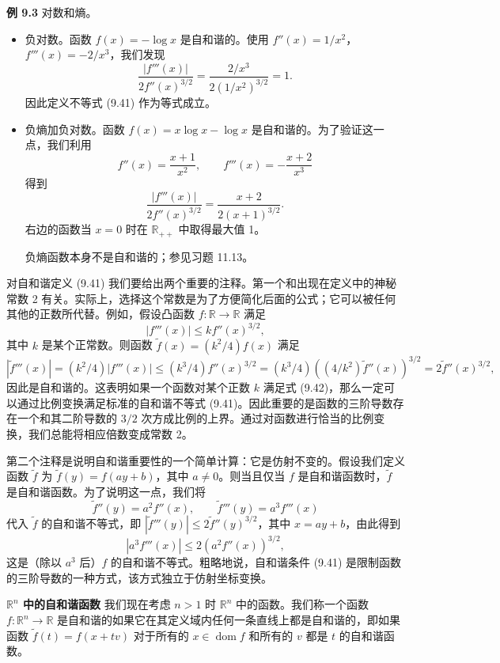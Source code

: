\documentclass[UTF8,12pt,a4paper,fontset=fandol]{ctexart}
\begin{document}
\noindent\textbf{例 9.3}\quad
对数和熵。
\begin{itemize}
\item 负对数。函数 $f(x)=-\log x$ 是自和谐的。使用 $f''(x)=1/x^2$，$f'''(x)=-2/x^3$，我们发现
\[
\frac{|f'''(x)|}{2f''(x)^{3/2}}=\frac{2/x^3}{2(1/x^2)^{3/2}}=1.
\]
因此定义不等式 (9.41) 作为等式成立。
\item 负熵加负对数。函数 $f(x)=x\log x-\log x$ 是自和谐的。为了验证这一点，我们利用
\[
f''(x)=\frac{x+1}{x^2},\qquad f'''(x)=-\frac{x+2}{x^3}
\]
得到
\[
\frac{|f'''(x)|}{2f''(x)^{3/2}}=\frac{x+2}{2(x+1)^{3/2}}.
\]
右边的函数当 $x=0$ 时在 $\mathbb{R}_{++}$ 中取得最大值 1。

负熵函数本身不是自和谐的；参见习题 11.13。
\end{itemize}

对自和谐定义 (9.41) 我们要给出两个重要的注释。第一个和出现在定义中的神秘常数 2 有关。实际上，选择这个常数是为了方便简化后面的公式；它可以被任何其他的正数所代替。例如，假设凸函数 $f:\mathbb{R}\to\mathbb{R}$ 满足
\begin{equation}
|f'''(x)|\leq kf''(x)^{3/2},
\tag{9.42}
\end{equation}
其中 $k$ 是某个正常数。则函数 $\tilde{f}(x)=(k^2/4)f(x)$ 满足
\[
|\tilde{f}'''(x)|=(k^2/4)|f'''(x)|
\leq (k^3/4)f''(x)^{3/2}
= (k^3/4)\left((4/k^2)\tilde{f}''(x)\right)^{3/2}
=2\tilde{f}''(x)^{3/2},
\]
因此是自和谐的。这表明如果一个函数对某个正数 $k$ 满足式 (9.42)，那么一定可以通过比例变换满足标准的自和谐不等式 (9.41)。因此重要的是函数的三阶导数存在一个和其二阶导数的 $3/2$ 次方成比例的上界。通过对函数进行恰当的比例变换，我们总能将相应倍数变成常数 2。

第二个注释是说明自和谐重要性的一个简单计算：它是仿射不变的。假设我们定义函数 $\tilde{f}$ 为 $\tilde{f}(y)=f(ay+b)$，其中 $a\neq0$。则当且仅当 $f$ 是自和谐函数时，$\tilde{f}$ 是自和谐函数。为了说明这一点，我们将
\[
\tilde{f}''(y)=a^2f''(x),\qquad \tilde{f}'''(y)=a^3f'''(x)
\]
代入 $\tilde{f}$ 的自和谐不等式，即 $|\tilde{f}'''(y)|\leq2\tilde{f}''(y)^{3/2}$，其中 $x=ay+b$，由此得到
\[
|a^3f'''(x)|\leq2(a^2f''(x))^{3/2},
\]
这是（除以 $a^3$ 后）$f$ 的自和谐不等式。粗略地说，自和谐条件 (9.41) 是限制函数的三阶导数的一种方式，该方式独立于仿射坐标变换。

\noindent\textbf{$\mathbb{R}^n$ 中的自和谐函数}\quad
我们现在考虑 $n>1$ 时 $\mathbb{R}^n$ 中的函数。我们称一个函数 $f:\mathbb{R}^n\to\mathbb{R}$ 是自和谐的如果它在其定义域内任何一条直线上都是自和谐的，即如果函数 $\tilde{f}(t)=f(x+tv)$ 对于所有的 $x\in\operatorname{dom} f$ 和所有的 $v$ 都是 $t$ 的自和谐函数。
\end{document}
